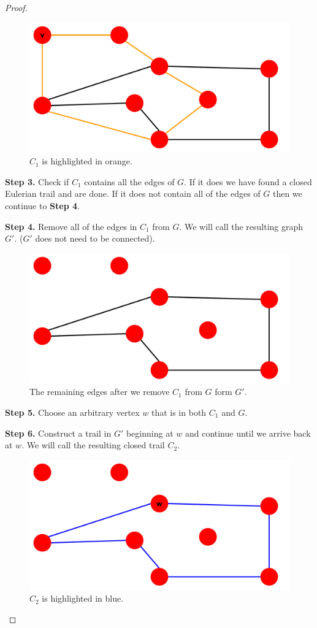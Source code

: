 \documentclass[10pt]{amsart}
\begin{document}
\begin{proof}
    \begin{figure}[h!]
        \centerline{
        {\includegraphics[width=.45\textwidth]{pictures/C1.pdf}}}
        \caption{$C_1$ is highlighted in orange.}\label{C1}
    \end{figure} 

    \noindent
    \textbf{Step 3.} Check if $C_1$ contains all the edges of $G$. If it does we have found a closed
    Eulerian trail and are done. If it does not contain all of the edges of $G$ then we continue to
    \textbf{Step 4}.

    \noindent
    \textbf{Step 4.} Remove all of the edges in $C_1$ from $G$. We will call the resulting graph $G'$.
    ($G'$ does not need to be connected).

    \begin{figure}[h!]
        \centerline{
        {\includegraphics[width=.45\textwidth]{pictures/G'.pdf}}}
        \caption{The remaining edges after we remove $C_1$ from $G$ form $G'$.}\label{G2}
    \end{figure} 

    \noindent
    \textbf{Step 5.} Choose an arbitrary vertex $w$ that is in both $C_1$ and $G$.

    \noindent
    \textbf{Step 6.} Construct a trail in $G'$ beginning at $w$ and continue until we arrive back at
    $w$. We will call the resulting closed trail $C_2$.

    \begin{figure}[h!]
        \centerline{
        {\includegraphics[width=.5\textwidth]{pictures/C2.pdf}}}
        \caption{$C_2$ is highlighted in blue.}\label{C2}
    \end{figure} 


\end{proof}
\end{document}
